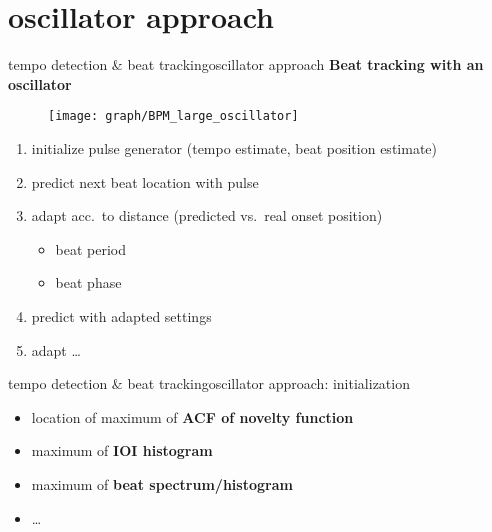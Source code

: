     \section{oscillator approach}
        \begin{frame}{tempo detection \& beat tracking}{oscillator approach}
            \vspace{-2mm}
            \textbf{Beat tracking with an oscillator}
            \begin{figure}
                \centering
                    \texttt{[image: graph/BPM\_large\_oscillator]}
            \end{figure}
            
            \begin{enumerate}
                \item	initialize pulse generator (tempo estimate, beat position estimate)
                \item<2->	predict next beat location with pulse
                \item<3->	adapt acc.\ to distance (predicted vs.\ real onset position)
                    \begin{itemize}
                        \item	beat period
                        \item	beat phase
                    \end{itemize}
                \item<4->	predict with adapted settings
                \item<4->   adapt \ldots
            \end{enumerate}
        \end{frame}
        \begin{frame}{tempo detection \& beat tracking}{oscillator approach: initialization}

            \begin{itemize}
                \item	location of maximum of \textbf{ACF of novelty function}
                \item<2->	maximum of \textbf{IOI histogram}
                \item<2->	maximum of \textbf{beat spectrum/histogram}
                \item<2->	\ldots
            \end{itemize}
        \end{frame}
